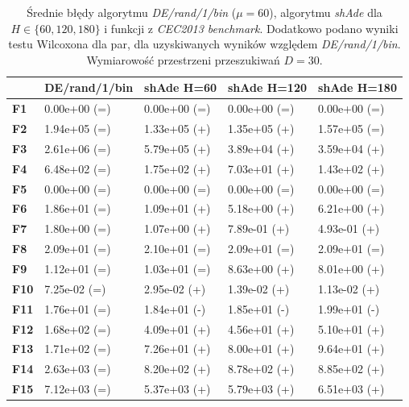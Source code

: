 \documentclass[12pt,a4paper]{report}
\begin{document}
{{{{{{{\begin{table}[h]
\centering
\caption{Średnie błędy algorytmu \emph{DE/rand/1/bin} ($\mu = 60$), algorytmu \emph{shAde} dla $H \in \{60, 120, 180\}$ i funkcji z \emph{CEC2013 benchmark}. Dodatkowo podano wyniki testu Wilcoxona dla par, dla uzyskiwanych wyników względem \emph{DE/rand/1/bin}. Wymiarowość przestrzeni przeszukiwań $D = 30$.}
\label{Anal18}
\begin{tabular}{|l|l|l|l|l|}
\hline
          & {\bf DE/rand/1/bin} & {\bf shAde H=60} & {\bf shAde H=120} & {\bf shAde H=180} \\ \hline
{\bf F1}  & 0.00e+00 (=)        & 0.00e+00 (=)     & 0.00e+00 (=)      & 0.00e+00 (=)      \\ \hline
{\bf F2}  & 1.94e+05 (=)        & 1.33e+05 (+)     & 1.35e+05 (+)      & 1.57e+05 (=)      \\ \hline
{\bf F3}  & 2.61e+06 (=)        & 5.79e+05 (+)     & 3.89e+04 (+)      & 3.59e+04 (+)      \\ \hline
{\bf F4}  & 6.48e+02 (=)        & 1.75e+02 (+)     & 7.03e+01 (+)      & 1.43e+02 (+)      \\ \hline
{\bf F5}  & 0.00e+00 (=)        & 0.00e+00 (=)     & 0.00e+00 (=)      & 0.00e+00 (=)      \\ \hline
{\bf F6}  & 1.86e+01 (=)        & 1.09e+01 (+)     & 5.18e+00 (+)      & 6.21e+00 (+)      \\ \hline
{\bf F7}  & 1.80e+00 (=)        & 1.07e+00 (+)     & 7.89e-01 (+)      & 4.93e-01 (+)      \\ \hline
{\bf F8}  & 2.09e+01 (=)        & 2.10e+01 (=)     & 2.09e+01 (=)      & 2.09e+01 (=)      \\ \hline
{\bf F9}  & 1.12e+01 (=)        & 1.03e+01 (=)     & 8.63e+00 (+)      & 8.01e+00 (+)      \\ \hline
{\bf F10} & 7.25e-02 (=)        & 2.95e-02 (+)     & 1.39e-02 (+)      & 1.13e-02 (+)      \\ \hline
{\bf F11} & 1.76e+01 (=)        & 1.84e+01 (-)     & 1.85e+01 (-)      & 1.99e+01 (-)      \\ \hline
{\bf F12} & 1.68e+02 (=)        & 4.09e+01 (+)     & 4.56e+01 (+)      & 5.10e+01 (+)      \\ \hline
{\bf F13} & 1.71e+02 (=)        & 7.26e+01 (+)     & 8.00e+01 (+)      & 9.64e+01 (+)      \\ \hline
{\bf F14} & 2.63e+03 (=)        & 8.20e+02 (+)     & 8.78e+02 (+)      & 8.85e+02 (+)      \\ \hline
{\bf F15} & 7.12e+03 (=)        & 5.37e+03 (+)     & 5.79e+03 (+)      & 6.51e+03 (+)      \\ \hline

\end{tabular}
\end{table}}}}}}}}
\end{document}
